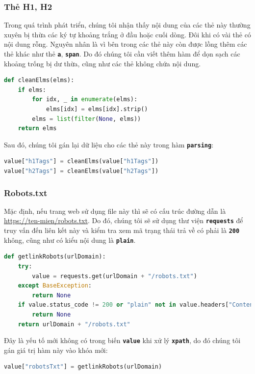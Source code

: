 \subsubsection{Thẻ H1, H2}
Trong quá trình phát triển, chúng tôi nhận thấy nội dung của các thẻ này thường xuyên bị thừa các ký tự khoảng trắng ở đầu hoặc cuối dòng. Đôi khi có vài thẻ có nội dung rỗng. Nguyên nhân là vì bên trong các thẻ này còn được lồng thêm các thẻ khác như thẻ \textbf{\texttt{a}}, \textbf{\texttt{span}}. Do đó chúng tôi cần viết thêm hàm để dọn sạch các khoảng trống bị dư thừa, cũng như các thẻ không chứa nội dung.
\begin{lstlisting}[language=Python]
def cleanElms(elms):
    if elms:
        for idx, _ in enumerate(elms):
            elms[idx] = elms[idx].strip()
        elms = list(filter(None, elms))
    return elms
\end{lstlisting}
\par
Sau đó, chúng tôi gán lại dữ liệu cho các thẻ này trong hàm \textbf{\texttt{parsing}}:
\begin{lstlisting}[language=Python]
value["h1Tags"] = cleanElms(value["h1Tags"])
value["h2Tags"] = cleanElms(value["h2Tags"])
\end{lstlisting}
\subsubsection{Robots.txt}
Mặc định, nếu trang web sử dụng file này thì sẽ có cấu trúc đường dẫn là \url{https://ten-mien/robots.txt}. Do đó, chúng tôi sẽ sử dụng thư viện \textbf{\texttt{requests}} để truy vấn đến liên kết này và kiểm tra xem mã trạng thái trả về có phải là \textbf{\texttt{200}} không, cũng như có kiểu nội dung là \textbf{\texttt{plain}}.
\begin{lstlisting}[language=Python]
def getlinkRobots(urlDomain):
    try:
        value = requests.get(urlDomain + "/robots.txt")
    except BaseException:
        return None
    if value.status_code != 200 or "plain" not in value.headers["Content-Type"]:
        return None
    return urlDomain + "/robots.txt"
\end{lstlisting}
\par
Đây là yếu tố mới không có trong biến \textbf{\texttt{value}} khi xử lý \textbf{\texttt{xpath}}, do đó chúng tôi gán giá trị hàm này vào khóa mới:
\begin{lstlisting}[language=Python]
value["robotsTxt"] = getlinkRobots(urlDomain)
\end{lstlisting}
